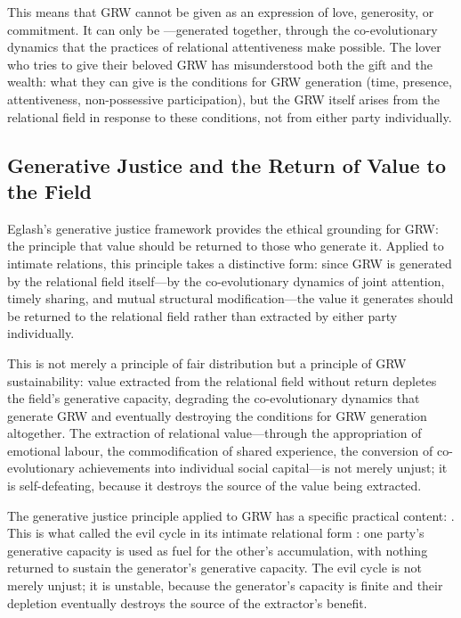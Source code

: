 This means that GRW cannot be given as an expression of love, generosity, or commitment. It can only be ---generated together, through the co-evolutionary dynamics that the practices of relational attentiveness make possible. The lover who tries to give their beloved GRW has misunderstood both the gift and the wealth: what they can give is the conditions for GRW generation (time, presence, attentiveness, non-possessive participation), but the GRW itself arises from the relational field in response to these conditions, not from either party individually.

\subsection{Generative Justice and the Return of Value to the Field}
\label{p15:subsec:gen_justice}

\noindent
Eglash's generative justice framework \parencite{eglash2016} provides the ethical grounding for GRW: the principle that value should be returned to those who generate it. Applied to intimate relations, this principle takes a distinctive form: since GRW is generated by the relational field itself---by the co-evolutionary dynamics of joint attention, timely sharing, and mutual structural modification---the value it generates should be returned to the relational field rather than extracted by either party individually.

This is not merely a principle of fair distribution but a principle of GRW sustainability: value extracted from the relational field without return depletes the field's generative capacity, degrading the co-evolutionary dynamics that generate GRW and eventually destroying the conditions for GRW generation altogether. The extraction of relational value---through the appropriation of emotional labour, the commodification of shared experience, the conversion of co-evolutionary achievements into individual social capital---is not merely unjust; it is self-defeating, because it destroys the source of the value being extracted.

The generative justice principle applied to GRW has a specific practical content: . This is what  called the evil cycle in its intimate relational form \parencite{paperix}: one party's generative capacity is used as fuel for the other's accumulation, with nothing returned to sustain the generator's generative capacity. The evil cycle is not merely unjust; it is unstable, because the generator's capacity is finite and their depletion eventually destroys the source of the extractor's benefit.

